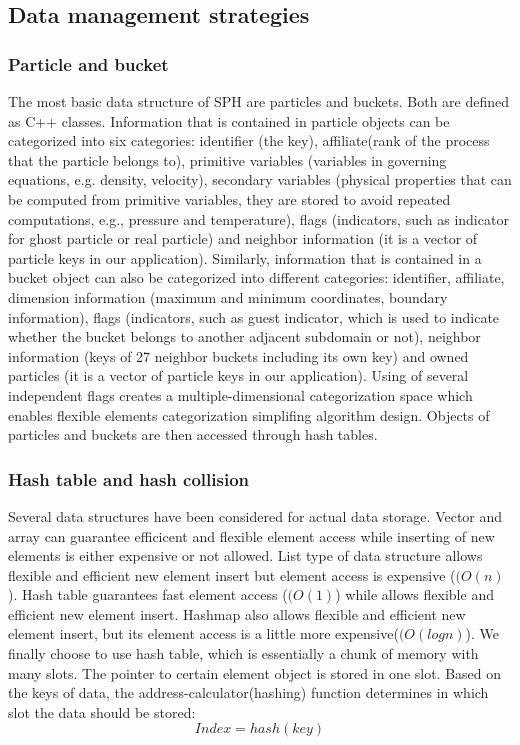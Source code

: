 \subsection{Data management strategies}
\subsubsection{Particle and bucket}
The most basic data structure of SPH are particles and buckets. Both are defined as C++ classes. Information that is contained in particle objects can be categorized into six categories: identifier (the key), affiliate(rank of the process that the particle belongs to), primitive variables (variables in governing equations, e.g. density, velocity), secondary variables (physical properties that can be computed from primitive variables, they are stored to avoid repeated computations, e.g., pressure and temperature), flags (indicators, such as indicator for ghost particle or real particle) and neighbor information (it is a vector of particle keys in our application). Similarly, information that is contained in a bucket object can also be categorized into different categories: identifier, affiliate, dimension information (maximum and minimum coordinates, boundary information), flags (indicators, such as guest indicator, which is used to indicate whether the bucket belongs to another adjacent subdomain or not), neighbor information (keys of 27 neighbor buckets including its own key) and owned particles (it is a vector of particle keys in our application).
Using of several independent flags creates a multiple-dimensional categorization space which enables flexible elements categorization simplifing algorithm design.
Objects of particles and buckets are then accessed through hash tables.

\subsubsection{Hash table and hash collision}
Several data structures have been considered for actual data storage. Vector and array can guarantee efficicent and flexible element access while inserting of new elements is either expensive or not allowed. List type of data structure allows flexible and efficient new element insert but element access is expensive ($(O(n)$).
Hash table guarantees fast element access ($(O(1)$) while allows flexible and efficient new element insert. Hashmap also allows flexible and efficient new element insert, but its element access is a little more expensive($(O(logn)$). We finally choose to use hash table, which is essentially a chunk of memory with many slots. The pointer to certain element object is stored in one slot. Based on the keys of data, the address-calculator(hashing) function determines in which slot the data should be stored:
\begin{equation}
Index = hash(key)
\end{equation}

